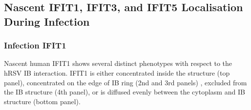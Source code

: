 \subsection{Nascent IFIT1, IFIT3, and IFIT5 Localisation During Infection} \label{subsec:Nascent IFIT1, IFIT3, and IFIT5 Localisation During Infection}
\subsubsection{Infection IFIT1}
Nascent human IFIT1 shows several distinct phenotypes with respect to the hRSV IB interaction. IFIT1 is either concentrated inside the structure (top panel), concentrated on the edge of IB ring (2nd and 3rd panels)  , excluded from the IB structure (4th panel),  or is diffused evenly between the cytoplasm and IB structure (bottom panel).

